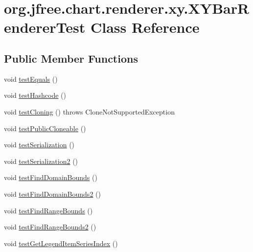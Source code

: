 \hypertarget{classorg_1_1jfree_1_1chart_1_1renderer_1_1xy_1_1_x_y_bar_renderer_test}{}\section{org.\+jfree.\+chart.\+renderer.\+xy.\+X\+Y\+Bar\+Renderer\+Test Class Reference}
\label{classorg_1_1jfree_1_1chart_1_1renderer_1_1xy_1_1_x_y_bar_renderer_test}
\subsection*{Public Member Functions}
\begin{DoxyCompactItemize}
\item 
void \mbox{\hyperlink{classorg_1_1jfree_1_1chart_1_1renderer_1_1xy_1_1_x_y_bar_renderer_test_a8f1bbcc9d8c617797bdf81d993e54276}{test\+Equals}} ()
\item 
void \mbox{\hyperlink{classorg_1_1jfree_1_1chart_1_1renderer_1_1xy_1_1_x_y_bar_renderer_test_aa83b7dfbee176f919edb1eaa40f5edcc}{test\+Hashcode}} ()
\item 
void \mbox{\hyperlink{classorg_1_1jfree_1_1chart_1_1renderer_1_1xy_1_1_x_y_bar_renderer_test_a31438132e4e12acd63d9098dae26483d}{test\+Cloning}} ()  throws Clone\+Not\+Supported\+Exception 
\item 
void \mbox{\hyperlink{classorg_1_1jfree_1_1chart_1_1renderer_1_1xy_1_1_x_y_bar_renderer_test_a148dd6e604fbe6600729ea796638d471}{test\+Public\+Cloneable}} ()
\item 
void \mbox{\hyperlink{classorg_1_1jfree_1_1chart_1_1renderer_1_1xy_1_1_x_y_bar_renderer_test_a531b814a69f37c62556b1ad8cdc1cbad}{test\+Serialization}} ()
\item 
void \mbox{\hyperlink{classorg_1_1jfree_1_1chart_1_1renderer_1_1xy_1_1_x_y_bar_renderer_test_a18c20d0b532f14665bffaa9d9a5f7606}{test\+Serialization2}} ()
\item 
void \mbox{\hyperlink{classorg_1_1jfree_1_1chart_1_1renderer_1_1xy_1_1_x_y_bar_renderer_test_a827806085dd8da0e8ce18edfb82d3874}{test\+Find\+Domain\+Bounds}} ()
\item 
void \mbox{\hyperlink{classorg_1_1jfree_1_1chart_1_1renderer_1_1xy_1_1_x_y_bar_renderer_test_a6e5415064f2ef041fcda9f43d033afb6}{test\+Find\+Domain\+Bounds2}} ()
\item 
void \mbox{\hyperlink{classorg_1_1jfree_1_1chart_1_1renderer_1_1xy_1_1_x_y_bar_renderer_test_a5b8dfc26d3fdfe14fb9452b8ff1bf42a}{test\+Find\+Range\+Bounds}} ()
\item 
void \mbox{\hyperlink{classorg_1_1jfree_1_1chart_1_1renderer_1_1xy_1_1_x_y_bar_renderer_test_a5af26172b4baf42527a2f5ff9c1da14b}{test\+Find\+Range\+Bounds2}} ()
\item 
void \mbox{\hyperlink{classorg_1_1jfree_1_1chart_1_1renderer_1_1xy_1_1_x_y_bar_renderer_test_a7b46e4c0318a61b999f80b7d49051b71}{test\+Get\+Legend\+Item\+Series\+Index}} ()
\end{DoxyCompactItemize}


